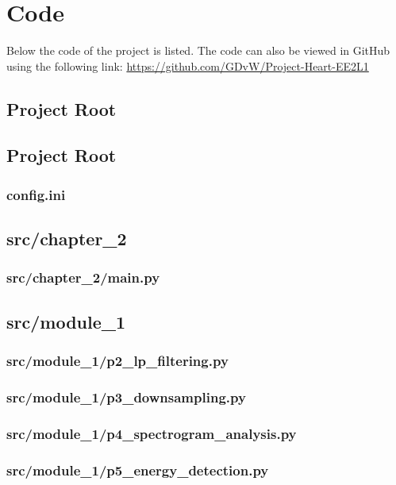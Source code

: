 \chapter{Code}
Below the code of the project is listed. The code can also be viewed in GitHub using the following link: \url{https://github.com/GDvW/Project-Heart-EE2L1}
\section{Project Root}

\section{Project Root}
\subsection*{config.ini}
\label{ap:config}
\section{src/chapter\_2}
\subsection*{src/chapter\_2/main.py}
\label{ap:main}
\section{src/module\_1}
\subsection*{src/module\_1/p2\_lp\_filtering.py}
\label{ap:p2_lp_filtering}
\subsection*{src/module\_1/p3\_downsampling.py}
\label{ap:p3_downsampling}
\subsection*{src/module\_1/p4\_spectrogram\_analysis.py}
\label{ap:p4_spectrogram_analysis}
\subsection*{src/module\_1/p5\_energy\_detection.py}
\label{ap:p5_energy_detection}
